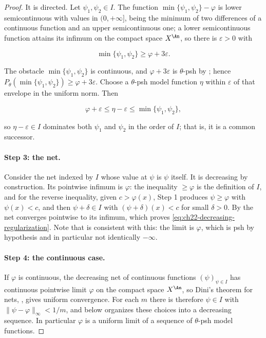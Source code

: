 \begin{proof}
It is directed.  Let \(\psi_1,\psi_2\in I\).  The function
\(\min\{\psi_1,\psi_2\}-\varphi\) is lower semicontinuous with values in
\((0,+\infty]\), being the minimum of two differences of a continuous
function and an upper semicontinuous one; a lower semicontinuous function
attains its infimum on the compact space \(X^{\An}\), so there is
\(\varepsilon>0\) with

\[
                   \min\{\psi_1,\psi_2\}\geq\varphi+3\varepsilon .
\tag{22.79}\label{eq:ch22-strict-gap}
\]

The obstacle \(\min\{\psi_1,\psi_2\}\) is continuous, and
\(\varphi+3\varepsilon\) is \(\theta\)-psh by
; hence
\(P_\theta(\min\{\psi_1,\psi_2\})\geq\varphi+3\varepsilon\).  Choose a
\(\theta\)-psh model function \(\eta\) within \(\varepsilon\) of that
envelope in the uniform norm.  Then

\[
       \varphi+\varepsilon
       \leq\eta-\varepsilon
       \leq\min\{\psi_1,\psi_2\},
\tag{22.80}\label{eq:ch22-directed-majorant}
\]

so \(\eta-\varepsilon\in I\) dominates both \(\psi_1\) and \(\psi_2\) in the
order of \(I\); that is, it is a common successor.

\paragraph{Step 3: the net.}
Consider the net indexed by \(I\) whose value at \(\psi\) is \(\psi\)
itself.  It is decreasing by construction.  Its pointwise infimum is
\(\varphi\): the inequality \(\geq\varphi\) is the definition of \(I\), and
for the reverse inequality, given \(c>\varphi(x)\), Step 1 produces
\(\psi\geq\varphi\) with \(\psi(x)<c\), and then
\(\psi+\delta\in I\) with \((\psi+\delta)(x)<c\) for small \(\delta>0\).
By  the net converges pointwise to its
infimum, which proves \eqref{eq:ch22-decreasing-regularization}.  Note that
 is consistent with this: the limit is
\(\varphi\), which is psh by hypothesis and in particular not identically
\(-\infty\).

\paragraph{Step 4: the continuous case.}
If \(\varphi\) is continuous, the decreasing net of continuous functions
\((\psi)_{\psi\in I}\) has continuous pointwise limit \(\varphi\) on the
compact space \(X^{\An}\), so Dini's theorem for nets,
, gives uniform convergence.  For each \(m\) there is
therefore \(\psi\in I\) with \(\|\psi-\varphi\|_\infty<1/m\), and
 below organizes these choices
into a decreasing sequence.  In particular \(\varphi\) is a uniform limit of
a sequence of \(\theta\)-psh model functions.
\end{proof}

